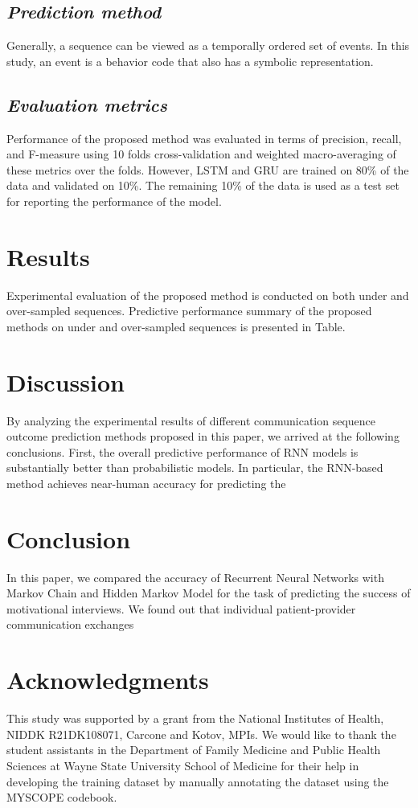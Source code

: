 \documentclass{amia}
\begin{document}
\subsection*{\textit{Prediction method}}
Generally, a sequence can be viewed as a temporally ordered set of events. In this study, an event is a behavior code that also has a symbolic representation.
  
\subsection*{\textit{Evaluation metrics}}
Performance of the proposed method was evaluated in terms of precision, recall, and F-measure using 10 folds cross-validation and weighted macro-averaging of these metrics over the folds. However, LSTM and GRU are trained on 80\% of the data and validated on 10\%. The remaining 10\% of the data is used as a test set for reporting the performance of the model. 

\section*{Results}
Experimental evaluation of the proposed method is conducted on both under and over-sampled sequences. Predictive performance summary of the proposed methods on under and over-sampled sequences is presented in Table.

\section*{Discussion}
By analyzing the experimental results of different communication sequence outcome prediction methods proposed in this paper, we arrived at the following conclusions. First, the overall predictive
performance of RNN models is substantially better than probabilistic models. In particular, the RNN-based method achieves near-human accuracy for predicting the 
 
\section*{Conclusion}
In this paper, we compared the accuracy of Recurrent Neural Networks with Markov Chain and Hidden Markov Model for the task of predicting the success of motivational interviews. We found out
that individual patient-provider communication exchanges 

\section*{Acknowledgments}
This study was supported by a grant from the National Institutes of Health, NIDDK R21DK108071, Carcone and Kotov, MPIs. We would like to thank the student assistants in the Department of Family Medicine and Public Health Sciences at Wayne State University School of Medicine for their help in developing the training dataset by manually annotating the dataset using the MYSCOPE codebook. 



\end{document}

